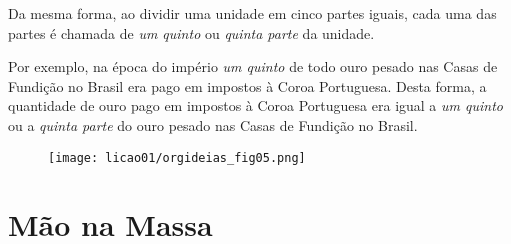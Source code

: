 Da mesma forma, ao dividir uma unidade em cinco partes iguais, cada uma das partes é chamada de \textit{um quinto} ou \textit{quinta parte} da unidade.

Por exemplo, na época do império \textit{um quinto} de todo ouro pesado nas Casas de Fundição no Brasil era pago em impostos à Coroa Portuguesa. Desta forma, a quantidade de ouro pago em impostos à Coroa Portuguesa era igual a \textit{um quinto} ou a \textit{quinta parte} do ouro pesado nas Casas de Fundição no Brasil.


\begin{figure}[H]
\centering

\texttt{[image: licao01/orgideias\_fig05.png]}
\end{figure}


\section{Mão na Massa}

